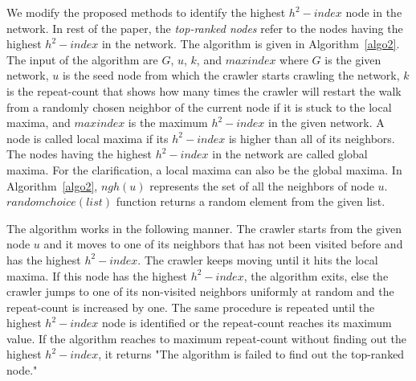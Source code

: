 \documentclass[conference]{IEEEtran}
\begin{document}
We modify the proposed methods to identify the highest $h^2-index$ node in the network. In rest of the paper, the \textit{top-ranked nodes} refer to the nodes having the highest $h^2-index$ in the network. The algorithm is given in Algorithm~\ref{algo2}. The input of the algorithm are $G$, $u$, $k$, and $maxindex$ where $G$ is the given network, $u$ is the seed node from which the crawler starts crawling the network, $k$ is the repeat-count that shows how many times the crawler will restart the walk from a randomly chosen neighbor of the current node if it is stuck to the local maxima, and $maxindex$ is the maximum $h^2-index$ in the given network. A node is called local maxima if its $h^2-index$ is higher than all of its neighbors. The nodes having the highest $h^2-index$ in the network are called global maxima. For the clarification, a local maxima can also be the global maxima. In Algorithm~\ref{algo2}, $ngh(u)$ represents the set of all the neighbors of node $u$. $randomchoice(list)$ function returns a random element from the given list. 

The algorithm works in the following manner. 
The crawler starts from the given node $u$ and it moves to one of its neighbors that has not been visited before and has the highest $h^2-index$. The crawler keeps moving until it hits the local maxima. If this node has the highest $h^2-index$, the algorithm exits, else the crawler jumps to one of its non-visited neighbors uniformly at random and the repeat-count is increased by one. The same procedure is repeated until the highest $h^2-index$ node is identified or the repeat-count reaches its maximum value. If the algorithm reaches to maximum repeat-count without finding out the highest $h^2-index$, it returns "The algorithm is failed to find out the top-ranked node." 
\end{document}
